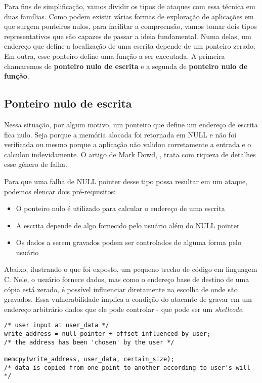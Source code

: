 	
		Para fins de simplificação, vamos dividir os tipos de ataques com essa técnica em duas famílias.
		Como podem existir várias formas de exploração de aplicações em que surgem ponteiros nulos,
		para facilitar a compreensão, vamos tomar dois tipos representativos que são capazes de passar
		a ideia fundamental.
		Numa delas, um endereço que define a localização de uma escrita depende de um ponteiro zerado.
		Em outra, esse ponteiro define uma função a ser executada.
		A primeira chamaremos de \textbf{ponteiro nulo de escrita} e a segunda de \textbf{ponteiro nulo de função}.


		\subsection{Ponteiro nulo de escrita}
		\label{subsec:ponteiro_escrita}
			Nessa situação, por algum motivo, um ponteiro que define um endereço de escrita fica nulo.
			Seja porque a memória alocada foi retornada em NULL e não foi verificada ou mesmo porque
			a aplicação não validou corretamente a entrada e o calculou indevidamente.
			O artigo de Mark Dowd, \cite{Dowd2008}, trata com riqueza de detalhes esse gênero de falha.
			

			Para que uma falha de NULL pointer desse tipo possa resultar em um ataque,
			podemos elencar dois pré-requisitos:
			\begin{itemize}
				\item{O ponteiro nulo é utilizado para calcular o endereço de uma escrita}
				\item{A escrita depende de algo fornecido pelo usuário além do NULL pointer}
				\item{Os dados a serem gravados podem ser controlados de alguma forma pelo usuário}
			\end{itemize}
			Abaixo, ilustrando o que foi exposto, um pequeno trecho de código em linguagem C.
			Nele, o usuário fornece dados, mas como o endereço base de destino de uma cópia está zerado,
			é possível influenciar diretamente na escolha de onde são gravados.
			Essa vulnerabilidade implica a condição do atacante de gravar em um endereço arbitrário dados
			que ele pode controlar - que pode ser um \textsl{shellcode}.
			\begin{lstlisting}[label=write_to_address,caption=Ponteiro em C]
/* user input at user_data */
write_address = null_pointer + offset_influenced_by_user;
/* the address has been 'chosen' by the user */

memcpy(write_address, user_data, certain_size);
/* data is copied from one point to another according to user's will */
			\end{lstlisting}
			
